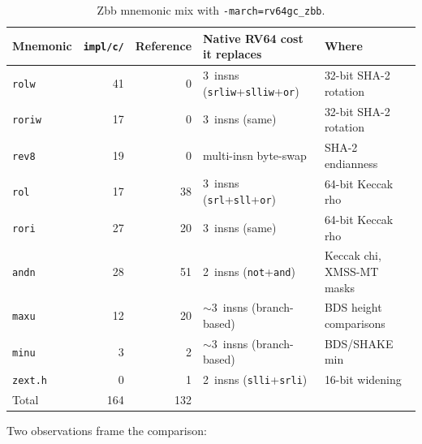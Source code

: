 \documentclass[11pt,a4paper]{article}
\begin{document}
\begin{table}[ht]
\centering
\caption{Zbb mnemonic mix with \texttt{-march=rv64gc\_zbb}.}
\label{tab:zbb-mix}
\begin{tabular}{@{}lrrll@{}}
\toprule
Mnemonic        & \texttt{impl/c/} & Reference & Native RV64 cost it replaces & Where \\
\midrule
\texttt{rolw}   & 41 & 0  & 3~insns (\texttt{srliw}+\texttt{slliw}+\texttt{or})  & 32-bit SHA-2 rotation \\
\texttt{roriw}  & 17 & 0  & 3~insns (same)                                      & 32-bit SHA-2 rotation \\
\texttt{rev8}   & 19 & 0  & multi-insn byte-swap                                & SHA-2 endianness \\
\texttt{rol}    & 17 & 38 & 3~insns (\texttt{srl}+\texttt{sll}+\texttt{or})     & 64-bit Keccak rho \\
\texttt{rori}   & 27 & 20 & 3~insns (same)                                      & 64-bit Keccak rho \\
\texttt{andn}   & 28 & 51 & 2~insns (\texttt{not}+\texttt{and})                 & Keccak chi, XMSS-MT masks \\
\texttt{maxu}   & 12 & 20 & $\sim$3~insns (branch-based)                        & BDS height comparisons \\
\texttt{minu}   &  3 &  2 & $\sim$3~insns (branch-based)                        & BDS/SHAKE min \\
\texttt{zext.h} &  0 &  1 & 2~insns (\texttt{slli}+\texttt{srli})               & 16-bit widening \\
\midrule
Total           & 164 & 132 & \multicolumn{2}{c}{} \\
\bottomrule
\end{tabular}
\end{table}

Two observations frame the comparison:
\end{document}
